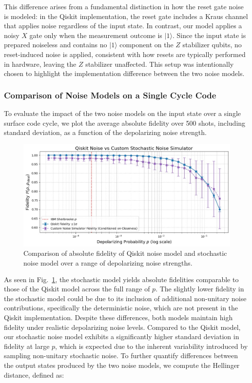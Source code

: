 \documentclass[9pt,a4paper,twocolumn,twoside]{tau-class/tau}
\begin{document}
This difference arises from a fundamental distinction in how the reset gate noise is modeled: in the Qiskit implementation, the reset gate includes a Kraus channel that applies noise regardless of the input state.  In contrast, our model applies a noisy \( X \) gate only when the measurement outcome is \( |1\rangle \). Since the input state is prepared noiseless and contains no \( |1\rangle \) component on the \( Z \) stabilizer qubits, no reset-induced noise is applied, consistent with how resets are typically performed in hardware, leaving the \( Z \) stabilizer unaffected. This setup was intentionally chosen to highlight the implementation difference between the two noise models.

\subsubsection*{Comparison of Noise Models on a Single Cycle Code}
To evaluate the impact of the two noise models on the input state over a single surface code cycle, we plot the average absolute fidelity over 500 shots, including standard deviation, as a function of the depolarizing noise strength.

\begin{figure}[H]
    \centering
        \includegraphics[width=1\linewidth]{figures/Fidelity_Qiskit_vs_Qutip.jpeg}
    \caption{Comparison of absolute fidelity of Qiskit noise model and stochastic noise model over a range of depolarizing noise strengths.}
    \label{fig:fidelity_comparison}
\end{figure}

As seen in Fig.~\ref{fig:fidelity_comparison}, the stochastic model yields absolute fidelities comparable to those of the Qiskit model across the full range of \( p \). The slightly lower fidelity in the stochastic model could be due to its inclusion of additional non-unitary noise contributions, specifically the deterministic noise, which are not present in the Qiskit implementation. Despite these differences, both models maintain high fidelity under realistic depolarizing noise levels. Compared to the Qiskit model, our stochastic noise model exhibits a significantly higher standard deviation in fidelity at large \( p \), which is expected due to the inherent variability introduced by sampling non-unitary stochastic noise.
To further quantify differences between the output states produced by the two noise models, we compute the Hellinger distance, defined as:
\end{document}
